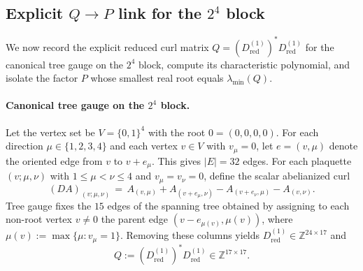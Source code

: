 \subsection{Explicit \texorpdfstring{$Q\to P$}{Q->P} link for the \texorpdfstring{$2^4$}{16} block}
\label{app:lambda_star_Q_to_P}

We now record the explicit reduced curl matrix $Q=(D_{\mathrm{red}}^{(1)})^{\ast}D_{\mathrm{red}}^{(1)}$ for the canonical tree gauge on the $2^4$ block,
compute its characteristic polynomial, and isolate the factor $P$ whose smallest real root equals $\lambda_{\min}(Q)$.

\paragraph{Canonical tree gauge on the $2^4$ block.}
Let the vertex set be $V=\{0,1\}^4$ with the root $0=(0,0,0,0)$.
For each direction $\mu\in\{1,2,3,4\}$ and each vertex $v\in V$ with $v_\mu=0$, let $e=(v,\mu)$ denote the oriented edge from $v$ to $v+e_\mu$.
This gives $|E|=32$ edges.
For each plaquette $(v;\mu,\nu)$ with $1\le\mu<\nu\le4$ and $v_\mu=v_\nu=0$, define the scalar abelianized curl
\[
(DA)_{(v;\mu,\nu)} \,=\, A_{(v,\mu)} + A_{(v+e_\mu,\nu)} - A_{(v+e_\nu,\mu)} - A_{(v,\nu)}.
\]
Tree gauge fixes the $15$ edges of the spanning tree obtained by assigning to each non-root vertex $v\neq 0$ the parent edge
$(v-e_{\mu(v)},\mu(v))$, where $\mu(v):=\max\{\mu: v_\mu=1\}$.
Removing these columns yields $D_{\mathrm{red}}^{(1)}\in\mathbb Z^{24\times 17}$ and
\begin{equation}
\label{eq:Q_def}
Q:=(D_{\mathrm{red}}^{(1)})^{\ast}D_{\mathrm{red}}^{(1)}\in\mathbb Z^{17\times17}.
\end{equation}

